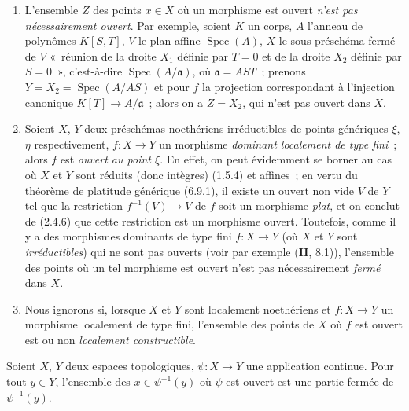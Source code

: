 \begin{remarks}[14.1.3]
\label{IV.14.1.3-fr}
\begin{enumerate}[label=(\roman*)]
  \item L'ensemble $Z$ des points $x\in X$ où un morphisme est ouvert
  \emph{n'est pas nécessairement ouvert}. Par exemple, soient $K$ un corps, $A$
  l'anneau de polynômes $K[S,T]$, $V$ le plan affine $\operatorname{Spec}(A)$,
  $X$ le sous-préschéma fermé de $V$ «~réunion de la droite $X_1$ définie par
  $T=0$ et de la droite $X_2$ définie par $S=0$~», c'est-à-dire
  $\operatorname{Spec}(A/\mathfrak a)$, où $\mathfrak a=AST$~; prenons
  $Y=X_2=\operatorname{Spec}(A/AS)$ et pour $f$ la projection correspondant à
  l'injection canonique $K[T]\to A/\mathfrak a$~; alors on a $Z=X_2$, qui n'est
  pas ouvert dans $X$.

  \item Soient $X$, $Y$ deux préschémas noethériens irréductibles de points
  génériques $\xi$, $\eta$ respectivement, $f:X\to Y$ un morphisme
  \emph{dominant localement de type fini}~; alors $f$ est \emph{ouvert au point
  $\xi$}. En effet, on peut évidemment se borner au cas où $X$ et $Y$ sont réduits
  (donc intègres) (1.5.4) et affines~; en vertu du théorème de platitude générique
  (6.9.1), il existe un ouvert non vide $V$ de $Y$ tel que la restriction
  $f^{-1}(V)\to V$ de $f$ soit un morphisme \emph{plat}, et on conclut de (2.4.6)
  que cette restriction est un morphisme ouvert. Toutefois, comme il y a des
  morphismes dominants de type fini $f:X\to Y$ (où $X$ et $Y$ sont
  \emph{irréductibles}) qui ne sont pas ouverts (voir par exemple (\textbf{II},
  8.1)), l'ensemble des points où un tel morphisme est ouvert n'est pas
  nécessairement \emph{fermé} dans $X$.

  \item Nous ignorons si, lorsque $X$ et $Y$ sont localement noethériens et
  $f:X\to Y$ un morphisme localement de type fini, l'ensemble des points de $X$
  où $f$ est ouvert est ou non \emph{localement constructible}.
\end{enumerate}
\end{remarks}

\begin{proposition}[14.1.4]
\label{IV.14.1.4-fr}
Soient $X$, $Y$ deux espaces topologiques, $\psi:X\to Y$ une application
continue. Pour tout $y\in Y$, l'ensemble des $x\in\psi^{-1}(y)$ où $\psi$ est
ouvert est une partie fermée de $\psi^{-1}(y)$.
\end{proposition}

